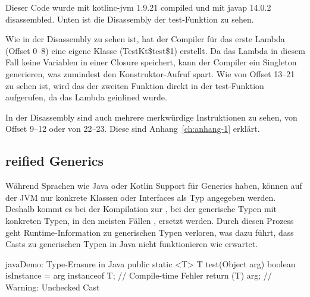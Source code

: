 Dieser Code wurde mit kotlinc-jvm 1.9.21 compiled und mit javap 14.0.2 disassembled.
Unten ist die Disassembly der test-Funktion zu sehen.


Wie in der Disassembly zu sehen ist, hat der Compiler für das erste Lambda (Offset 0--8) eine eigene Klasse
(TestKt\$test\$1) erstellt.
Da das Lambda in diesem Fall keine Variablen in einer Closure speichert, kann der Compiler ein Singleton generieren,
was zumindest den Konstruktor-Aufruf spart.
Wie von Offset 13--21 zu sehen ist, wird das  der zweiten Funktion direkt in der test-Funktion
aufgerufen, da das Lambda geinlined wurde.

\begin{infoBox}
In der Disassembly sind auch mehrere merkwürdige Instruktionen zu sehen, \zB von Offset 9--12 oder von 22--23.
Diese sind Anhang~\ref{ch:anhang-1} erklärt.
\end{infoBox}

\subsection{reified Generics}

Während Sprachen wie Java oder Kotlin Support für Generics haben, können auf der JVM nur konkrete Klassen oder
Interfaces als Typ angegeben werden.
Deshalb kommt es bei der Kompilation zur , bei der generische Typen mit konkreten Typen, in den meisten
Fällen , ersetzt werden.
Durch diesen Prozess geht Runtime-Information zu generischen Typen verloren, was \zB dazu führt, dass Casts zu
generischen Typen in Java nicht funktionieren wie erwartet.

\begin{codeBlock}{java}{Demo: Type-Erasure in Java}
public static <T> T test(Object arg) {
    boolean isInstance = arg instanceof T; // Compile-time Fehler
    return (T) arg; // Warning: Unchecked Cast
}
\end{codeBlock}

